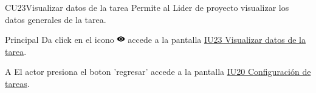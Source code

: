 \begin{UseCase}{CU23}{Visualizar datos de la tarea}{
		Permite al Lider de proyecto visualizar los datos generales de la tarea.
	}
	\end{UseCase}
	\begin{UCtrayectoria}{Principal}
		\UCpaso[\UCactor] Da click en el icono \includegraphics[height=10pt]{./images/iconos/ic_visibility_black_18dp.png}
        \UCpaso [\UCsist] accede a la pantalla \hyperref[fig:IU23]{IU23 Visualizar datos de la tarea}. 
	\end{UCtrayectoria}
\begin{UCtrayectoriaA}{A}{ El actor presiona el boton 'regresar'}
			\UCpaso [\UCsist] accede a la pantalla \hyperref[fig:IU20]{IU20 Configuración de tareas}.
		\end{UCtrayectoriaA}		
		
